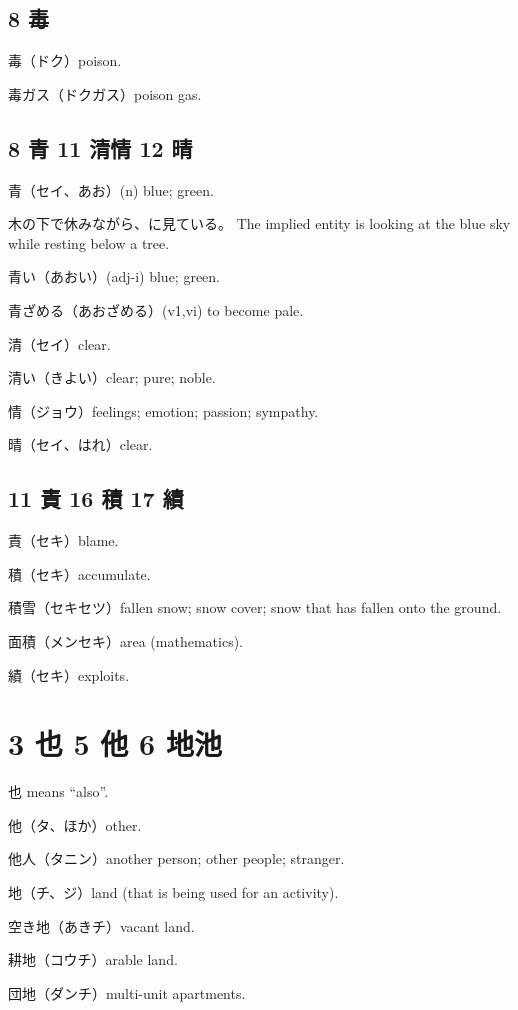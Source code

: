 \subsection{8 毒}

毒（ドク）poison.

毒ガス（ドクガス）poison gas.

\subsection{8 青 11 清情 12 晴}

青（セイ、あお）(n) blue; green.

木の下で休みながら、に見ている。
The implied entity is looking at the blue sky while resting below a tree.

青い（あおい）(adj-i) blue; green.

青ざめる（あおざめる）(v1,vi) to become pale.

清（セイ）clear.

清い（きよい）clear; pure; noble.

情（ジョウ）feelings; emotion; passion; sympathy.

晴（セイ、はれ）clear.

\subsection{11 責 16 積 17 績}

責（セキ）blame.

積（セキ）accumulate.

積雪（セキセツ）fallen snow;
snow cover;
snow that has fallen onto the ground.

面積（メンセキ）area (mathematics).

績（セキ）exploits.

\section{3 也 5 他 6 地池}

也 means ``also''.

他（タ、ほか）other.

他人（タニン）another person; other people; stranger.

地（チ、ジ）land (that is being used for an activity).

空き地（あきチ）vacant land.

耕地（コウチ）arable land.

団地（ダンチ）multi-unit apartments.

